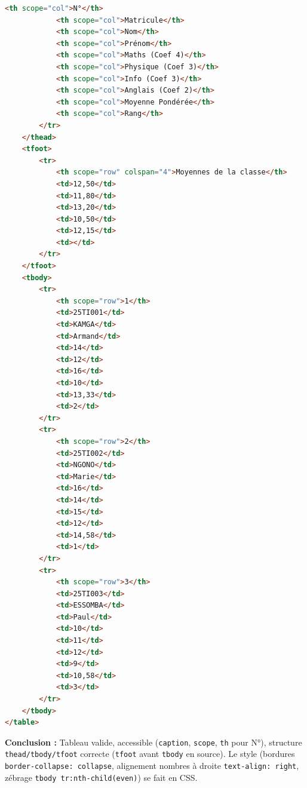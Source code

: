 \documentclass[11pt]{article}
\newcounter{popsec}
\newcounter{popsub}
\newcommand{\courssub}[1]{%
  \stepcounter{popsub}%
  \par\vspace{9pt}\noindent{\popxbold\fontsize{11.5}{13}\selectfont\color{popink}{\color{poporange}\thepopsec.\thepopsub}\hspace{6pt}#1}\par\nopagebreak\vspace{4pt}
}
\begin{document}
\begin{exoresolu}
\begin{lstlisting}[language=HTML]
            <th scope="col">N°</th>
            <th scope="col">Matricule</th>
            <th scope="col">Nom</th>
            <th scope="col">Prénom</th>
            <th scope="col">Maths (Coef 4)</th>
            <th scope="col">Physique (Coef 3)</th>
            <th scope="col">Info (Coef 3)</th>
            <th scope="col">Anglais (Coef 2)</th>
            <th scope="col">Moyenne Pondérée</th>
            <th scope="col">Rang</th>
        </tr>
    </thead>
    <tfoot>
        <tr>
            <th scope="row" colspan="4">Moyennes de la classe</th>
            <td>12,50</td>
            <td>11,80</td>
            <td>13,20</td>
            <td>10,50</td>
            <td>12,15</td>
            <td></td>
        </tr>
    </tfoot>
    <tbody>
        <tr>
            <th scope="row">1</th>
            <td>25TI001</td>
            <td>KAMGA</td>
            <td>Armand</td>
            <td>14</td>
            <td>12</td>
            <td>16</td>
            <td>10</td>
            <td>13,33</td>
            <td>2</td>
        </tr>
        <tr>
            <th scope="row">2</th>
            <td>25TI002</td>
            <td>NGONO</td>
            <td>Marie</td>
            <td>16</td>
            <td>14</td>
            <td>15</td>
            <td>12</td>
            <td>14,58</td>
            <td>1</td>
        </tr>
        <tr>
            <th scope="row">3</th>
            <td>25TI003</td>
            <td>ESSOMBA</td>
            <td>Paul</td>
            <td>10</td>
            <td>11</td>
            <td>12</td>
            <td>9</td>
            <td>10,58</td>
            <td>3</td>
        </tr>
    </tbody>
</table>
    \end{lstlisting}
    \textbf{Conclusion :} Tableau valide, accessible (\texttt{caption}, \texttt{scope}, \texttt{th} pour N°), structure \texttt{thead/tbody/tfoot} correcte (\texttt{tfoot} avant \texttt{tbody} en source). Le style (bordures \texttt{border-collapse: collapse}, alignement nombres à droite \texttt{text-align: right}, zébrage \texttt{tbody tr:nth-child(even)}) se fait en CSS.
\end{exoresolu}

\courssub{JavaScript et le DOM}
\end{document}
